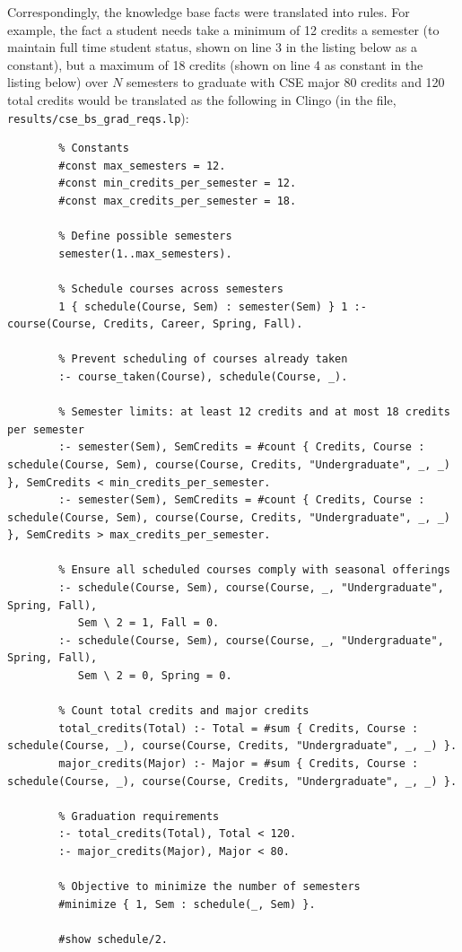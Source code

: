 \documentclass[12pt]{article}
\begin{document}
    Correspondingly, the knowledge base facts were translated into rules. For example, the fact a student needs take a minimum of 12 credits a semester (to maintain full time student status, shown on line 3 in the listing below as a constant), but a maximum of 18 credits (shown on line 4 as constant in the listing below) over $N$ semesters to graduate with CSE major 80 credits and 120 total credits would be translated as the following in Clingo (in the file, {\tt{results/cse\_bs\_grad\_reqs.lp}}): \\

    \begin{lstlisting}
        % Constants
        #const max_semesters = 12.
        #const min_credits_per_semester = 12.
        #const max_credits_per_semester = 18.
        
        % Define possible semesters
        semester(1..max_semesters).
        
        % Schedule courses across semesters
        1 { schedule(Course, Sem) : semester(Sem) } 1 :- course(Course, Credits, Career, Spring, Fall).
        
        % Prevent scheduling of courses already taken
        :- course_taken(Course), schedule(Course, _).
        
        % Semester limits: at least 12 credits and at most 18 credits per semester
        :- semester(Sem), SemCredits = #count { Credits, Course : schedule(Course, Sem), course(Course, Credits, "Undergraduate", _, _) }, SemCredits < min_credits_per_semester.
        :- semester(Sem), SemCredits = #count { Credits, Course : schedule(Course, Sem), course(Course, Credits, "Undergraduate", _, _) }, SemCredits > max_credits_per_semester.

        % Ensure all scheduled courses comply with seasonal offerings
        :- schedule(Course, Sem), course(Course, _, "Undergraduate", Spring, Fall), 
           Sem \ 2 = 1, Fall = 0.
        :- schedule(Course, Sem), course(Course, _, "Undergraduate", Spring, Fall), 
           Sem \ 2 = 0, Spring = 0.
        
        % Count total credits and major credits
        total_credits(Total) :- Total = #sum { Credits, Course : schedule(Course, _), course(Course, Credits, "Undergraduate", _, _) }.
        major_credits(Major) :- Major = #sum { Credits, Course : schedule(Course, _), course(Course, Credits, "Undergraduate", _, _) }.
        
        % Graduation requirements
        :- total_credits(Total), Total < 120.
        :- major_credits(Major), Major < 80.
        
        % Objective to minimize the number of semesters
        #minimize { 1, Sem : schedule(_, Sem) }.
        
        #show schedule/2.
    \end{lstlisting}
\end{document}
